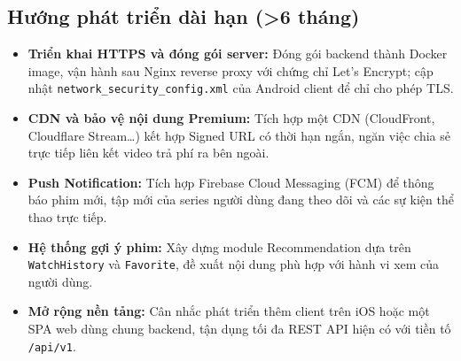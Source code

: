 \subsection{Hướng phát triển dài hạn (>6 tháng)}
\begin{itemize}
    \item \textbf{Triển khai HTTPS và đóng gói server:} Đóng gói backend thành Docker image, vận hành sau Nginx reverse proxy với chứng chỉ Let's Encrypt; cập nhật \texttt{network\_security\_config.xml} của Android client để chỉ cho phép TLS.
    \item \textbf{CDN và bảo vệ nội dung Premium:} Tích hợp một CDN (CloudFront, Cloudflare Stream\dots) kết hợp Signed URL có thời hạn ngắn, ngăn việc chia sẻ trực tiếp liên kết video trả phí ra bên ngoài.
    \item \textbf{Push Notification:} Tích hợp Firebase Cloud Messaging (FCM) để thông báo phim mới, tập mới của series người dùng đang theo dõi và các sự kiện thể thao trực tiếp.
    \item \textbf{Hệ thống gợi ý phim:} Xây dựng module Recommendation dựa trên \texttt{WatchHistory} và \texttt{Favorite}, đề xuất nội dung phù hợp với hành vi xem của người dùng.
    \item \textbf{Mở rộng nền tảng:} Cân nhắc phát triển thêm client trên iOS hoặc một SPA web dùng chung backend, tận dụng tối đa REST API hiện có với tiền tố \texttt{/api/v1}.
\end{itemize}
